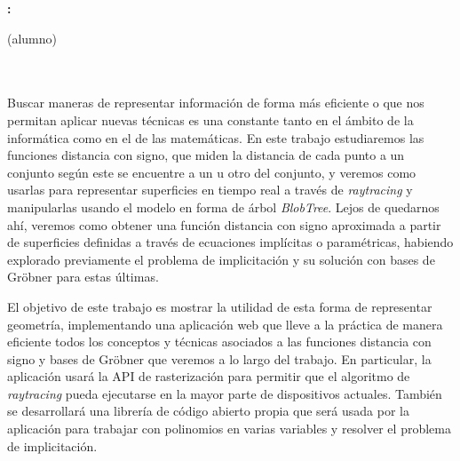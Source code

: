 \thispagestyle{empty}

\begin{center}
{\large\bfseries \miTitulo: \miSubtitulo}\\
\end{center}
\begin{center}
\miNombre (alumno)\\
\end{center}

\\

\vspace{0.7cm}
\\

Buscar maneras de representar información de forma más eficiente o que nos permitan aplicar nuevas técnicas es una constante tanto en el ámbito de la informática como en el de las matemáticas. En este trabajo estudiaremos las funciones distancia con signo, que miden la distancia de cada punto a un conjunto según este se encuentre a un  u otro del conjunto, y veremos como usarlas para representar superficies en tiempo real a través de \textit{raytracing} y manipularlas usando el modelo en forma de árbol \textit{BlobTree}. Lejos de quedarnos ahí, veremos como obtener una función distancia con signo aproximada a partir de superficies definidas a través de ecuaciones implícitas o paramétricas, habiendo explorado previamente el problema de implicitación y su solución con bases de Gröbner para estas últimas.\newline

El objetivo de este trabajo es mostrar la utilidad de esta forma de representar geometría, implementando una aplicación web que lleve a la práctica de manera eficiente todos los conceptos y técnicas asociados a las funciones distancia con signo y bases de Gröbner que veremos a lo largo del trabajo. En particular, la aplicación usará la API de rasterización para permitir que el algoritmo de \textit{raytracing} pueda ejecutarse en la mayor parte de dispositivos actuales. También se desarrollará una librería de código abierto propia que será usada por la aplicación para trabajar con polinomios en varias variables y resolver el problema de implicitación.
\cleardoublepage


